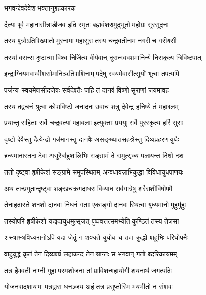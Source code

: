 
\onelineshloka
{भगवन्देवदेवेश भक्तानुग्रहकारक} %

\twolineshloka
{दैत्यः पूर्व महानासीन्नाडीजव इति स्मृतः}
{ब्रह्मवंशसमुद्भूतो महोग्रः सुरसूदनः} %

\twolineshloka
{तस्य पुत्रोऽतिविख्यातो मुरनामा महासुरः}
{तस्य चन्द्रवतीनाम नगरी च गरीयसी} %

\twolineshloka
{तस्यां वसन्स दुष्टात्मा विश्व निर्जित्य वीर्यवान्}
{तुरान्स्ववशमानिन्ये निराकृत्य त्रिविष्टपात्} %

\twolineshloka
{इन्द्राग्नियमवाय्वीशसोमानिऋतिपाशिनाम्}
{पदेषु स्वयमेवासीत्सूर्यो भूत्वा तपत्यपि} %

\twolineshloka
{पर्जन्यः स्वयमेवासीदजेयः सर्वदेवतैः}
{जहि तं दानवं विष्णो सुराणां जयमावह} %

\twolineshloka
{तस्य तद्वचनं श्रुत्वा कोपाविष्टो जनादनः}
{उवाच शत्रु देवेन्द्र हनिष्ये तं महाबलम्} %

\twolineshloka
{प्रयान्तु सहिताः सर्वे चन्द्रवत्यां महाबलाः}
{इत्युक्ताः प्रययुः सर्वे पुरस्कृत्य हरिं सुराः} %

\twolineshloka
{दृष्टो देवैस्तु दैत्येन्द्रो गर्जमानस्तु दानवैः}
{असङ्ख्यातसहस्रेस्तु दिव्यप्रहरणायुधैः} %

\twolineshloka
{हन्यमानास्तदा देवा असुरैर्बाहुशालिभिः}
{सङ्ग्रामं ते समुत्सृज्य पलायन्त दिशो दश} %

\twolineshloka
{ततो दृष्ट्वा हृषीकेशं सङ्ग्रामे समुपस्थितम्}
{अन्वधावन्नाभिकुद्धा विविधायुधपाणयः} %

\twolineshloka
{अथ तान्प्रगुतान्दृष्ट्वा शङ्खचक्रगदाधरः}
{विव्याध सर्वगात्रेषु शरैराशीविषोपमै} %

\twolineshloka
{तेनाहतास्ते शनशो दानवा निधनं गताः}
{एकाङ्गो दानवः स्थित्वा युध्यमानो मुहुर्मुहुः} %

\twolineshloka
{तस्योपरि हृषीकेशो यद्यदायुधमुत्सृजत्}
{पुष्पवत्तत्समभ्येति कुण्ठितं तस्य तेजसा} %

\twolineshloka
{शस्त्रास्त्रविध्यमानोऽपि यदा जेतुं न शक्यते}
{युयोध च तदा क्रुद्धो बाहुभिः परिघोपमैः} %

\twolineshloka
{वाहुयुद्धं कृतं तेन दिव्यवर्ष लहाकन्द}
{तेन श्रान्तः स भगवान् गतो बदरिकाश्रमम्} %

\twolineshloka
{तत्र हैमवती नाम्नी गुहा परमशोजना}
{तां प्राविशन्महायोगी शयनार्थ जगत्पतिः} %

\twolineshloka
{योजनबादशायामः पत्रद्वारा धनञ्जय}
{अहं तत्र प्रसुप्तोस्मि भयभीतो न संशयः} %

